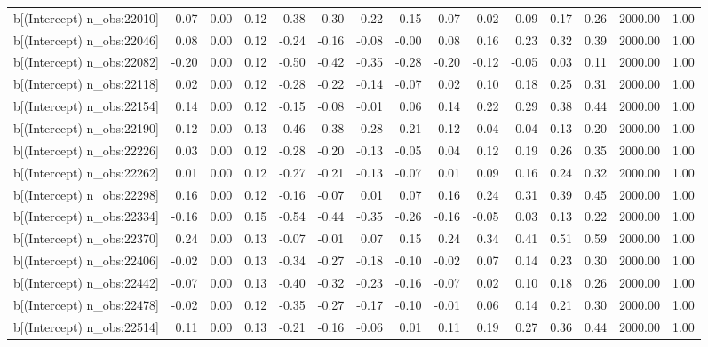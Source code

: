 \begin{table}[ht]
\begin{tabular}{rrrrrrrrrrrrrrr}
  b[(Intercept) n\_obs:22010] & -0.07 & 0.00 & 0.12 & -0.38 & -0.30 & -0.22 & -0.15 & -0.07 & 0.02 & 0.09 & 0.17 & 0.26 & 2000.00 & 1.00 \\ 
  b[(Intercept) n\_obs:22046] & 0.08 & 0.00 & 0.12 & -0.24 & -0.16 & -0.08 & -0.00 & 0.08 & 0.16 & 0.23 & 0.32 & 0.39 & 2000.00 & 1.00 \\ 
  b[(Intercept) n\_obs:22082] & -0.20 & 0.00 & 0.12 & -0.50 & -0.42 & -0.35 & -0.28 & -0.20 & -0.12 & -0.05 & 0.03 & 0.11 & 2000.00 & 1.00 \\ 
  b[(Intercept) n\_obs:22118] & 0.02 & 0.00 & 0.12 & -0.28 & -0.22 & -0.14 & -0.07 & 0.02 & 0.10 & 0.18 & 0.25 & 0.31 & 2000.00 & 1.00 \\ 
  b[(Intercept) n\_obs:22154] & 0.14 & 0.00 & 0.12 & -0.15 & -0.08 & -0.01 & 0.06 & 0.14 & 0.22 & 0.29 & 0.38 & 0.44 & 2000.00 & 1.00 \\ 
  b[(Intercept) n\_obs:22190] & -0.12 & 0.00 & 0.13 & -0.46 & -0.38 & -0.28 & -0.21 & -0.12 & -0.04 & 0.04 & 0.13 & 0.20 & 2000.00 & 1.00 \\ 
  b[(Intercept) n\_obs:22226] & 0.03 & 0.00 & 0.12 & -0.28 & -0.20 & -0.13 & -0.05 & 0.04 & 0.12 & 0.19 & 0.26 & 0.35 & 2000.00 & 1.00 \\ 
  b[(Intercept) n\_obs:22262] & 0.01 & 0.00 & 0.12 & -0.27 & -0.21 & -0.13 & -0.07 & 0.01 & 0.09 & 0.16 & 0.24 & 0.32 & 2000.00 & 1.00 \\ 
  b[(Intercept) n\_obs:22298] & 0.16 & 0.00 & 0.12 & -0.16 & -0.07 & 0.01 & 0.07 & 0.16 & 0.24 & 0.31 & 0.39 & 0.45 & 2000.00 & 1.00 \\ 
  b[(Intercept) n\_obs:22334] & -0.16 & 0.00 & 0.15 & -0.54 & -0.44 & -0.35 & -0.26 & -0.16 & -0.05 & 0.03 & 0.13 & 0.22 & 2000.00 & 1.00 \\ 
  b[(Intercept) n\_obs:22370] & 0.24 & 0.00 & 0.13 & -0.07 & -0.01 & 0.07 & 0.15 & 0.24 & 0.34 & 0.41 & 0.51 & 0.59 & 2000.00 & 1.00 \\ 
  b[(Intercept) n\_obs:22406] & -0.02 & 0.00 & 0.13 & -0.34 & -0.27 & -0.18 & -0.10 & -0.02 & 0.07 & 0.14 & 0.23 & 0.30 & 2000.00 & 1.00 \\ 
  b[(Intercept) n\_obs:22442] & -0.07 & 0.00 & 0.13 & -0.40 & -0.32 & -0.23 & -0.16 & -0.07 & 0.02 & 0.10 & 0.18 & 0.26 & 2000.00 & 1.00 \\ 
  b[(Intercept) n\_obs:22478] & -0.02 & 0.00 & 0.12 & -0.35 & -0.27 & -0.17 & -0.10 & -0.01 & 0.06 & 0.14 & 0.21 & 0.30 & 2000.00 & 1.00 \\ 
  b[(Intercept) n\_obs:22514] & 0.11 & 0.00 & 0.13 & -0.21 & -0.16 & -0.06 & 0.01 & 0.11 & 0.19 & 0.27 & 0.36 & 0.44 & 2000.00 & 1.00 \\ 

\end{tabular}
\end{table}
